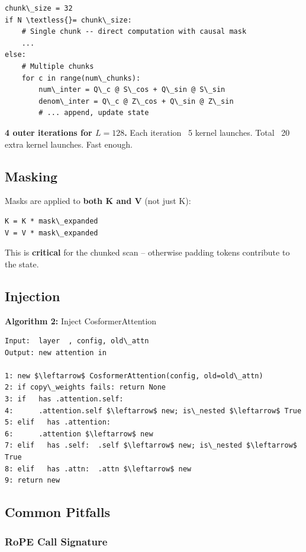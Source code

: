 \begin{lstlisting}
chunk\_size = 32
if N \textless{}= chunk\_size:
    # Single chunk -- direct computation with causal mask
    ...
else:
    # Multiple chunks
    for c in range(num\_chunks):
        num\_inter = Q\_c @ S\_cos + Q\_sin @ S\_sin
        denom\_inter = Q\_c @ Z\_cos + Q\_sin @ Z\_sin
        # ... append, update state
\end{lstlisting}

\textbf{4 outer iterations for $L = 128$.} Each iteration ~5 kernel launches. 
Total ~20 extra kernel launches. Fast enough.

\subsection{Masking}

Masks are applied to \textbf{both K and V} (not just K):

\begin{lstlisting}
K = K * mask\_expanded
V = V * mask\_expanded
\end{lstlisting}

This is \textbf{critical} for the chunked scan -- otherwise padding tokens 
contribute to the state.

\subsection{Injection}

\textbf{Algorithm 2:} Inject CosformerAttention
\begin{lstlisting}
Input:  layer  , config, old\_attn
Output: new attention in  

1: new $\leftarrow$ CosformerAttention(config, old=old\_attn)
2: if copy\_weights fails: return None
3: if   has .attention.self:
4:      .attention.self $\leftarrow$ new; is\_nested $\leftarrow$ True
5: elif   has .attention:
6:      .attention $\leftarrow$ new
7: elif   has .self:  .self $\leftarrow$ new; is\_nested $\leftarrow$ True
8: elif   has .attn:  .attn $\leftarrow$ new
9: return new
\end{lstlisting}

\subsection{Common Pitfalls}

\subsubsection{RoPE Call Signature}

